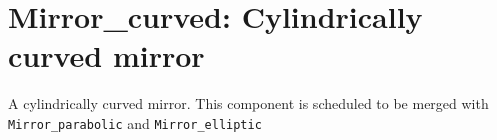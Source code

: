 \section{Mirror\_curved: Cylindrically curved mirror}


A cylindrically curved mirror.
This component is scheduled to be merged with \texttt{Mirror_parabolic} and \texttt{Mirror_elliptic} 
